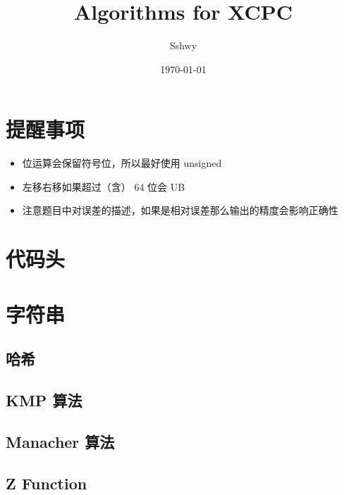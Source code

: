 \documentclass[a4paper,12pt]{article}
\begin{document}
\title{Algorithms for XCPC}
\author{Sshwy}
\date{\today}
\maketitle

\newpage

\tableofcontents
\newpage
{}

\section{提醒事项}

\begin{itemize}
    \item 位运算会保留符号位，所以最好使用 unsigned
    \item 左移右移如果超过（含） 64 位会 UB
    \item 注意题目中对误差的描述，如果是相对误差那么输出的精度会影响正确性
\end{itemize}

\section{代码头}



\section{字符串}

\subsection{哈希}

\subsection{KMP 算法}

\subsection{Manacher 算法}

\subsection{Z Function}

\end{document}
